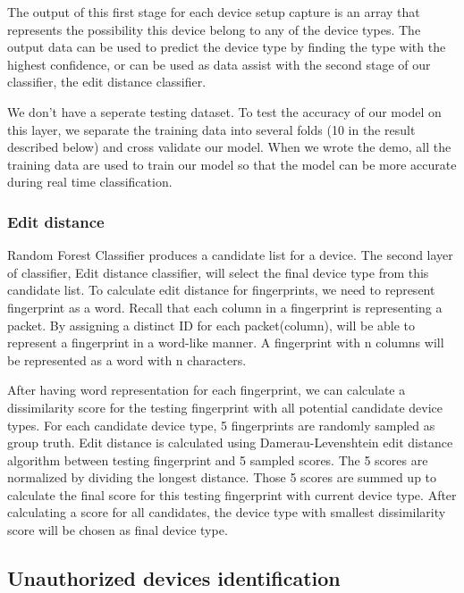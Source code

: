 \documentclass[twocolumn,10pt]{article}
\begin{document}
The output of this first stage for each device setup capture is an array that represents the possibility this device belong to any of the device types. The output data can be used to predict the device type by finding the type with the highest confidence, or can be used as data assist with the second stage of our classifier, the edit distance classifier.

We don’t have a seperate testing dataset. To test the accuracy of our model on this layer, we separate the training data into several folds (10 in the result described below) and cross validate our model. When we wrote the demo, all the training data are used to train our model so that the model can be more accurate during real time classification. 


\subsubsection{Edit distance}

Random Forest Classifier produces a candidate list for a device. The second layer of classifier, Edit distance classifier, will select the final device type from this candidate list. To calculate edit distance for fingerprints, we need to represent fingerprint as a word. Recall that each column in a fingerprint is representing a packet. By assigning a distinct ID for each packet(column), will be able to represent a fingerprint in a word-like manner. A fingerprint with n columns will be represented as a word with n characters. 

After having word representation for each fingerprint, we can calculate a dissimilarity score for the testing fingerprint with all potential candidate device types. For each candidate device type, 5 fingerprints are randomly sampled as group truth. Edit distance is calculated using Damerau-Levenshtein edit distance algorithm between testing fingerprint and 5 sampled scores. The 5 scores are normalized by dividing the longest distance. Those 5 scores are summed up to calculate the final score for this testing fingerprint with current device type. After calculating a score for all candidates, the device type with smallest dissimilarity score will be chosen as final device type. 

\subsection{Unauthorized devices identification}
\end{document}
